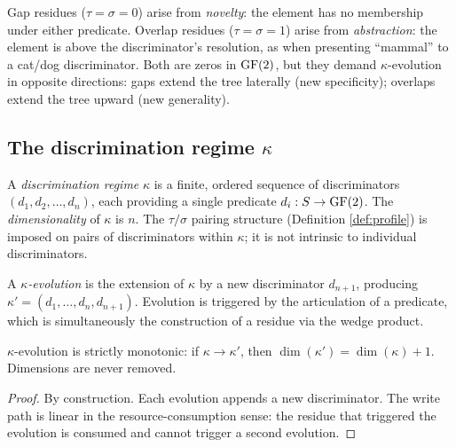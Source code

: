 \begin{remark}\label{rem:residue-origins}
Gap residues ($\tau = \sigma = 0$) arise from \emph{novelty}: the
element has no membership under either predicate. Overlap residues
($\tau = \sigma = 1$) arise from \emph{abstraction}: the element
is above the discriminator's resolution, as when presenting ``mammal''
to a cat/dog discriminator. Both are zeros in $\operatorname{GF}(2)$, but they
demand $\kappa$-evolution in opposite directions: gaps extend the
tree laterally (new specificity); overlaps extend the tree upward
(new generality).
\end{remark}

\subsection{The discrimination regime $\kappa$}

\begin{definition}\label{def:kappa}
A \emph{discrimination regime} $\kappa$ is a finite, ordered
sequence of discriminators $(d_1, d_2, \ldots, d_n)$, each
providing a single predicate $d_i: S \to \operatorname{GF}(2)$. The
\emph{dimensionality} of $\kappa$ is $n$. The $\tau/\sigma$
pairing structure (Definition \ref{def:profile}) is imposed
on pairs of discriminators within $\kappa$; it is not
intrinsic to individual discriminators.
\end{definition}

\begin{definition}\label{def:evolution}
A \emph{$\kappa$-evolution} is the extension of $\kappa$ by a new
discriminator $d_{n+1}$, producing $\kappa' = (d_1, \ldots, d_n, d_{n+1})$.
Evolution is triggered by the articulation of a predicate, which is
simultaneously the construction of a residue via the wedge product.
\end{definition}

\begin{proposition}\label{prop:monotone}
$\kappa$-evolution is strictly monotonic: if $\kappa \to \kappa'$,
then $\dim(\kappa') = \dim(\kappa) + 1$. Dimensions are never removed.
\end{proposition}

\begin{proof}
By construction. Each evolution appends a new discriminator. The write
path is linear in the resource-consumption sense: the residue that
triggered the evolution is consumed and cannot trigger a second evolution.
\end{proof}

